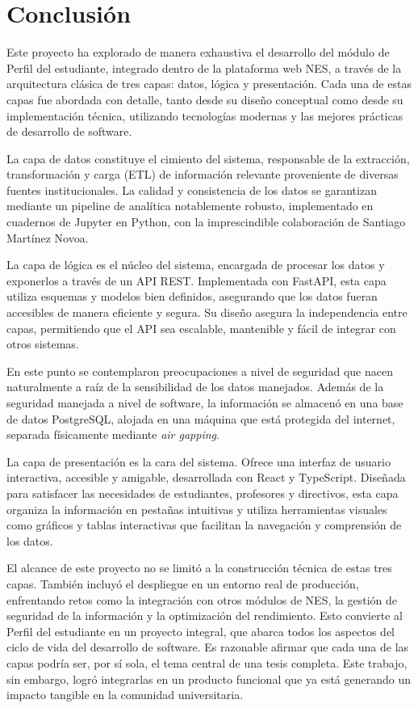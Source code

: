 \chapter{Conclusión}
\label{ch:conclusion}

Este proyecto ha explorado de manera exhaustiva el desarrollo del módulo de Perfil del estudiante, integrado dentro de la plataforma web \gls{NES}, a través de la arquitectura clásica de tres capas: datos, lógica y presentación. Cada una de estas capas fue abordada con detalle, tanto desde su diseño conceptual como desde su implementación técnica, utilizando tecnologías modernas y las mejores prácticas de desarrollo de software.

La capa de datos constituye el cimiento del sistema, responsable de la extracción, transformación y carga (\gls{ETL}) de información relevante proveniente de diversas fuentes institucionales. La calidad y consistencia de los datos se garantizan mediante un pipeline de analítica notablemente robusto, implementado en cuadernos de \gls{Jupyter} en \gls{Python}, con la imprescindible colaboración de Santiago Martínez Novoa.

La capa de lógica es el núcleo del sistema, encargada de procesar los datos y exponerlos a través de un \gls{API REST}. Implementada con \gls{FastAPI}, esta capa utiliza esquemas y modelos bien definidos, asegurando que los datos fueran accesibles de manera eficiente y segura. Su diseño asegura la independencia entre capas, permitiendo que el \gls{API} sea escalable, mantenible y fácil de integrar con otros sistemas.

En este punto se contemplaron preocupaciones a nivel de seguridad que nacen naturalmente a raíz de la sensibilidad de los datos manejados. Además de la seguridad manejada a nivel de software, la información se almacenó en una base de datos \gls{PostgreSQL}, alojada en una máquina que está protegida del internet, separada físicamente mediante \textit{air gapping}.

La capa de presentación es la cara del sistema. Ofrece una interfaz de usuario interactiva, accesible y amigable, desarrollada con \gls{React} y \gls{TypeScript}. Diseñada para satisfacer las necesidades de estudiantes, profesores y directivos, esta capa organiza la información en pestañas intuitivas y utiliza herramientas visuales como gráficos y tablas interactivas que facilitan la navegación y comprensión de los datos.

El alcance de este proyecto no se limitó a la construcción técnica de estas tres capas. También incluyó el despliegue en un entorno real de producción, enfrentando retos como la integración con otros módulos de \gls{NES}, la gestión de seguridad de la información y la optimización del rendimiento. Esto convierte al Perfil del estudiante en un proyecto integral, que abarca todos los aspectos del ciclo de vida del desarrollo de software. Es razonable afirmar que cada una de las capas podría ser, por sí sola, el tema central de una tesis completa. Este trabajo, sin embargo, logró integrarlas en un producto funcional que ya está generando un impacto tangible en la comunidad universitaria.

